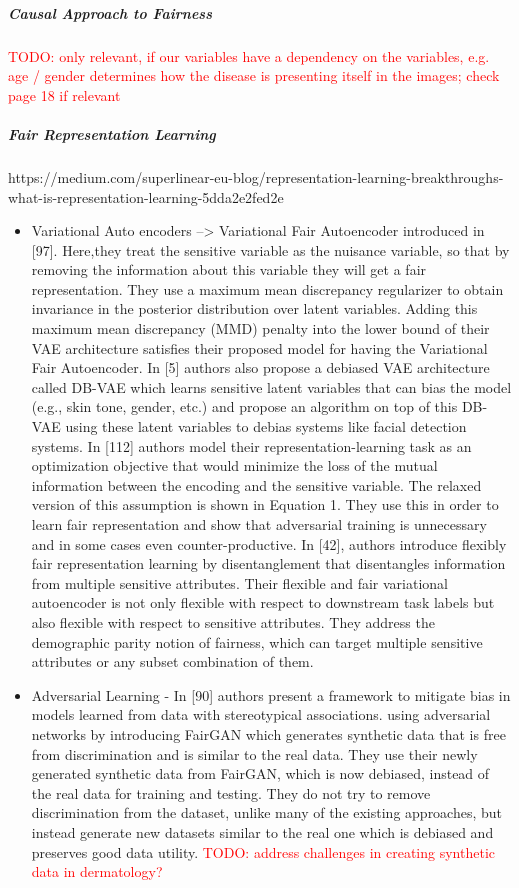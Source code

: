 \documentclass[12pt, a4paper, oneside]{book}   	%
\renewcommand{\todo}[1]{\textcolor{red}{TODO: #1}}
\begin{document}
			\subparagraph{Causal Approach to Fairness}
				\todo{only relevant, if our variables have a dependency on the variables, e.g. age / gender determines how the disease is presenting itself in the images; check \autocite{Mehrabi_2021} page 18 if relevant}
				
			\subparagraph{Fair Representation Learning}
				https://medium.com/superlinear-eu-blog/representation-learning-breakthroughs-what-is-representation-learning-5dda2e2fed2e
				\begin{itemize}
					\item Variational Auto encoders --> Variational Fair Autoencoder introduced in [97]. Here,they treat the sensitive variable as the nuisance variable, so that by removing the information about this variable they will get a fair representation. They use a maximum mean discrepancy regularizer to obtain invariance in the posterior distribution over latent variables. Adding this maximum mean discrepancy (MMD) penalty into the lower bound of their VAE architecture satisfies their proposed model for having the Variational Fair Autoencoder. \newline
					In [5] authors also propose a debiased VAE architecture called DB-VAE which learns sensitive latent variables that can bias the model (e.g., skin tone, gender, etc.) and propose an algorithm on top of this DB-VAE using these latent variables to debias systems like facial detection systems. \newline
					In [112] authors model their representation-learning task as an optimization objective that would minimize the loss of the mutual information between the encoding and the sensitive variable. The relaxed version of this assumption is shown in Equation 1. They use this in order to learn fair representation and show that adversarial training is unnecessary and in some cases even counter-productive. \newline
					In [42], authors introduce flexibly fair representation learning by disentanglement that disentangles information from multiple sensitive attributes. Their flexible and fair variational autoencoder is not only flexible with respect to downstream task labels but also flexible with respect to sensitive attributes. They address the demographic parity notion of fairness, which can target multiple sensitive attributes or any subset combination of them. \autocite{Mehrabi_2021}
					\item Adversarial Learning - In [90] authors present a framework to mitigate bias in models learned from data with stereotypical associations. using adversarial networks by introducing FairGAN which generates synthetic data that is free from discrimination and is similar to the real data. They use their newly generated synthetic data from FairGAN, which is now debiased, instead of the real data for training and testing. They do not try to remove discrimination from the dataset, unlike many of the existing approaches, but instead generate new datasets similar to the real one which is debiased and preserves good data utility. \autocite{Mehrabi_2021} \todo{address challenges in creating synthetic data in dermatology?}
				\end{itemize}
			
\end{document}
